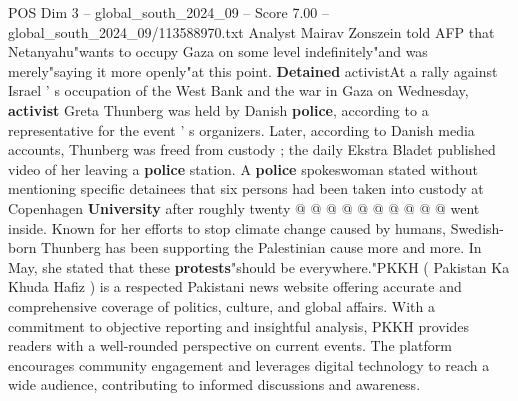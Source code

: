 \begin{textsample}{POS Dim 3 – global\_south\_2024\_09 – Score 7.00 – global\_south\_2024\_09/113588970.txt}
Analyst Mairav Zonszein told AFP that Netanyahu"wants to occupy Gaza on some level indefinitely"and was merely"saying it more openly"at this point. \textbf{Detained} activistAt a rally against Israel ' s occupation of the West Bank and the war in Gaza on Wednesday, \textbf{activist} Greta Thunberg was held by Danish \textbf{police}, according to a representative for the event ' s organizers.
Later, according to Danish media accounts, Thunberg was freed from custody ; the daily Ekstra Bladet published video of her leaving a \textbf{police} station.
A \textbf{police} spokeswoman stated without mentioning specific detainees that six persons had been taken into custody at Copenhagen \textbf{University} after roughly twenty @ @ @ @ @ @ @ @ @ @ went inside.
Known for her efforts to stop climate change caused by humans, Swedish-born Thunberg has been supporting the Palestinian cause more and more.
In May, she stated that these \textbf{protests}"should be everywhere."PKKH ( Pakistan Ka Khuda Hafiz ) is a respected Pakistani news website offering accurate and comprehensive coverage of politics, culture, and global affairs.
With a commitment to objective reporting and insightful analysis, PKKH provides readers with a well-rounded perspective on current events.
The platform encourages community engagement and leverages digital technology to reach a wide audience, contributing to informed discussions and awareness.

\end{textsample}
